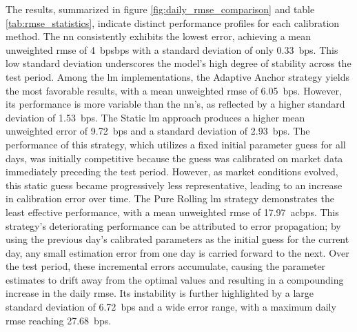 The results, summarized in figure \ref{fig:daily_rmse_comparison} and table \ref{tab:rmse_statistics}, indicate distinct performance profiles for each calibration method. The \ac{nn} consistently exhibits the lowest error, achieving a mean unweighted \ac{rmse} of 4~\ac{bps}bps with a standard deviation of only 0.33~\ac{bps}. This low standard deviation underscores the model's high degree of stability across the test period. Among the \ac{lm} implementations, the Adaptive Anchor strategy yields the most favorable results, with a mean unweighted \ac{rmse} of 6.05~\ac{bps}. However, its performance is more variable than the \ac{nn}'s, as reflected by a higher standard deviation of 1.53~\ac{bps}. The Static \ac{lm} approach produces a higher mean unweighted error of 9.72~\ac{bps} and a standard deviation of 2.93~\ac{bps}. The performance of this strategy, which utilizes a fixed initial parameter guess for all days, was initially competitive because the guess was calibrated on market data immediately preceding the test period. However, as market conditions evolved, this static guess became progressively less representative, leading to an increase in calibration error over time. The Pure Rolling \ac{lm} strategy demonstrates the least effective performance, with a mean unweighted \ac{rmse} of 17.97~ac{bps}. This strategy's deteriorating performance can be attributed to error propagation; by using the previous day's calibrated parameters as the initial guess for the current day, any small estimation error from one day is carried forward to the next. Over the test period, these incremental errors accumulate, causing the parameter estimates to drift away from the optimal values and resulting in a compounding increase in the daily \ac{rmse}. Its instability is further highlighted by a large standard deviation of 6.72~\ac{bps} and a wide error range, with a maximum daily \ac{rmse} reaching 27.68~\ac{bps}.

